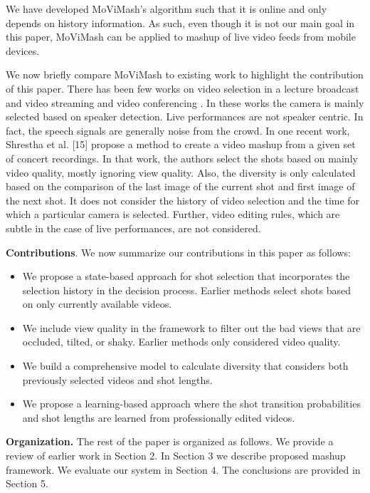 \documentclass{sig-alternate}
\begin{document}
We have developed MoViMash’s algorithm such that it is online and only depends on history information. As such, even though it is not our main goal in this paper, MoViMash can be applied to mashup of live video feeds from mobile devices.

 We now brieﬂy compare MoViMash to existing work to highlight the contribution of this paper. There has been few works on video selection in a lecture broadcast and video streaming \cite{carter2007ceramic} \cite{economou1983green} and video conferencing \cite{fassas2002hematopoietic}. In these works the camera is mainly selected based on speaker detection. Live performances are not speaker centric. In fact, the speech signals are generally noise from the crowd. In one recent work, Shrestha et al. [15] propose a method to create a video mashup from a given set of concert recordings. In that work, the authors select the shots based on mainly video quality, mostly ignoring view quality. Also, the diversity is only calculated based on the comparison of the last image of the current shot and ﬁrst image of the next shot. It does not consider the history of video selection and the time for which a particular camera is selected. Further, video editing rules, which are subtle in the case of live performances, are not considered. 

\textbf {Contributions}. We now summarize our contributions in this paper as follows:
\begin{itemize}
\item We propose a state-based approach for shot selection that incorporates the selection history in the decision process. Earlier methods select shots based on only currently available videos. 
\item We include view quality in the framework to ﬁlter out the bad views that are occluded, tilted, or shaky. Earlier methods only considered video quality. 
\item We build a comprehensive model to calculate diversity that considers both previously selected videos and shot lengths. \item We propose a learning-based approach where the shot transition probabilities and shot lengths are learned from professionally edited videos. 
\end{itemize}
\textbf{Organization.} The rest of the paper is organized as follows. We provide a review of earlier work in Section 2. In Section 3 we describe proposed mashup framework. We evaluate our system in Section 4. The conclusions are provided in Section 5.
\end{document}
